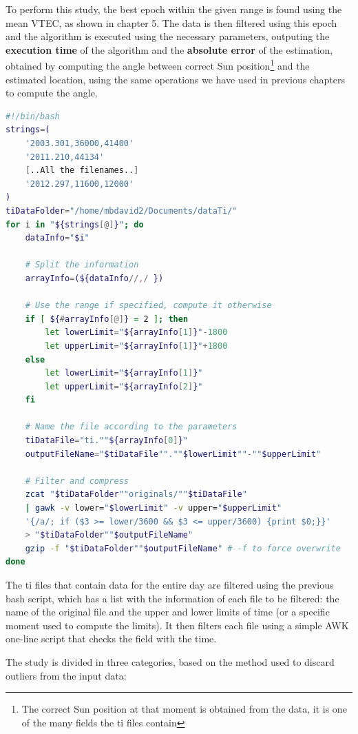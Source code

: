 To perform this study, the best epoch within the given range is found using the mean VTEC, as shown in chapter 5. The data is then filtered using this epoch and the algorithm is executed using the necessary parameters, outputing the \textbf{execution time} of the algorithm and the \textbf{absolute error} of the estimation, obtained by computing the angle between correct Sun position\footnote{The correct Sun position at that moment is obtained from the data, it is one of the many fields the ti files contain} and the estimated location, using the same operations we have used in previous chapters to compute the angle. 

\begin{minipage}{\linewidth}
	\begin{lstlisting}[language=Bash, caption=Filtering the ti file]
#!/bin/bash	
strings=(
	'2003.301,36000,41400'
	'2011.210,44134'
	[..All the filenames..] 
	'2012.297,11600,12000'
)
tiDataFolder="/home/mbdavid2/Documents/dataTi/"
for i in "${strings[@]}"; do
	dataInfo="$i"
	
	# Split the information
	arrayInfo=(${dataInfo//,/ })
	
	# Use the range if specified, compute it otherwise
	if [ ${#arrayInfo[@]} = 2 ]; then
		let lowerLimit="${arrayInfo[1]}"-1800
		let upperLimit="${arrayInfo[1]}"+1800
	else
		let lowerLimit="${arrayInfo[1]}"
		let upperLimit="${arrayInfo[2]}"
	fi
	
	# Name the file according to the parameters
	tiDataFile="ti.""${arrayInfo[0]}"
	outputFileName="$tiDataFile"".""$lowerLimit""-""$upperLimit"
	
	# Filter and compress
	zcat "$tiDataFolder""originals/""$tiDataFile" 
	| gawk -v lower="$lowerLimit" -v upper="$upperLimit" 
	'{/a/; if ($3 >= lower/3600 && $3 <= upper/3600) {print $0;}}' 
	> "$tiDataFolder""$outputFileName"
	gzip -f "$tiDataFolder""$outputFileName" # -f to force overwrite
done\end{lstlisting}
\end{minipage}

The ti files that contain data for the entire day are filtered using the previous bash script, which has a list with the information of each file to be filtered: the name of the original file and the upper and lower limits of time (or a specific moment used to compute the limits). It then filters each file using a simple AWK one-line script that checks the field with the time.

The study is divided in three categories, based on the method used to discard outliers from the input data:


